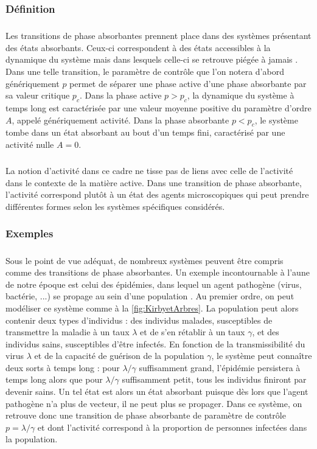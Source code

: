 \subsubsection{Définition}

\subparagraph{}Les transitions de phase absorbantes prennent place dans des systèmes présentant des états absorbants. Ceux-ci correspondent à des états accessibles à la dynamique du système mais dans lesquels celle-ci se retrouve piégée à jamais \cite{lubeck_universal_2004}. Dans une telle transition, le paramètre de contrôle que l'on notera d'abord génériquement $p$ permet de séparer une phase active d'une phase absorbante par sa valeur critique $p_c$. Dans la phase active $p>p_c$, la dynamique du système à temps long est caractérisée par une valeur moyenne positive du paramètre d'ordre $A$, appelé génériquement activité. Dans la phase absorbante $p<p_c$, le système tombe dans un état absorbant au bout d'un temps fini, caractérisé par une activité nulle $A=0$. 

\subparagraph{}La notion d'activité dans ce cadre ne tisse pas de liens avec celle de l'activité dans le contexte de la matière active. Dans une transition de phase absorbante, l'activité correspond plutôt à un état des agents microscopiques qui peut prendre différentes formes selon les systèmes spécifiques considérés.

\subsubsection{Exemples}

\subparagraph{}Sous le point de vue adéquat, de nombreux systèmes peuvent être compris comme des transitions de phase absorbantes. Un exemple incontournable à l'aune de notre époque est celui des épidémies, dans lequel un agent pathogène (virus, bactérie, ...) se propage au sein d'une population \cite{hinrichsen_non_equilibrium_2000, dickman_nonequilibrium_2002, lubeck_universal_2004}. Au premier ordre, on peut modéliser ce système comme à la \autoref{fig:KirbyetArbres}. La population peut alors contenir deux types d'individus : des individus malades, susceptibles de transmettre la maladie à un taux $\lambda$ et de s'en rétablir à un taux $\gamma$, et des individus sains, susceptibles d'être infectés. En fonction de la transmissibilité du virus $\lambda$ et de la capacité de guérison de la population $\gamma$, le système peut connaître deux sorts à temps long : pour $\lambda/\gamma$ suffisamment grand, l'épidémie persistera à temps long alors que pour $\lambda/\gamma$ suffisamment petit, tous les individus finiront par devenir sains. Un tel état est alors un état absorbant puisque dès lors que l'agent pathogène n'a plus de vecteur, il ne peut plus se propager. Dans ce système, on retrouve donc une transition de phase absorbante de paramètre de contrôle $p = \lambda/\gamma$ et dont l'activité correspond à la proportion de personnes infectées dans la population.

